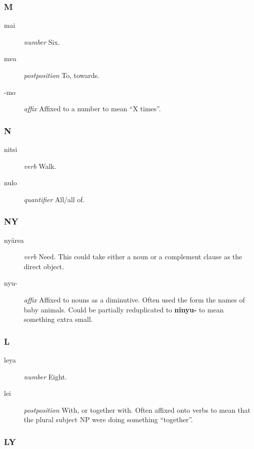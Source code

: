 \documentclass{article}
\begin{document}
\subsubsection{M}

\begin{description}
\item [mai] \emph{number} Six.
\item [mea] \emph{postposition} To, towards.
\item [-mo] \emph{affix} Affixed to a number to mean ``X times''.
\end{description}

\subsubsection{N}

\begin{description}
\item [nitsi] \emph{verb} Walk.
\item [nulo] \emph{quantifier} All/all of.
\end{description}

\subsubsection{NY}

\begin{description}
\item [ny\"area] \emph{verb} Need.  This could take either a noun or a complement clause as the direct object.
\item [nyu-] \emph{affix} Affixed to nouns as a diminutive.  Often used the form the names of baby animals.  Could be partially reduplicated to \textbf{ninyu-} to mean something extra small.
\end{description}

\subsubsection{L}

\begin{description}
\item [leya] \emph{number} Eight.
\item [lei] \emph{postposition} With, or together with.  Often affixed onto verbs to mean that the plural subject NP were doing something ``together''.
\end{description}

\subsubsection{LY}
\end{document}
